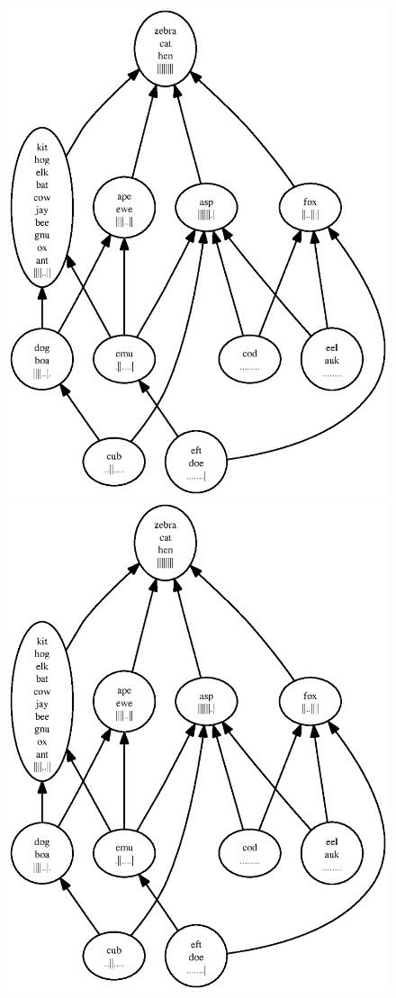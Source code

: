 \documentclass[11pt,twoside]{article}
\begin{document}
\begin{figure}
\centering
\includegraphics[scale=0.5]{rank1.ps}
\includegraphics[scale=0.5]{rank2.ps}

\end{figure}
\end{document}
